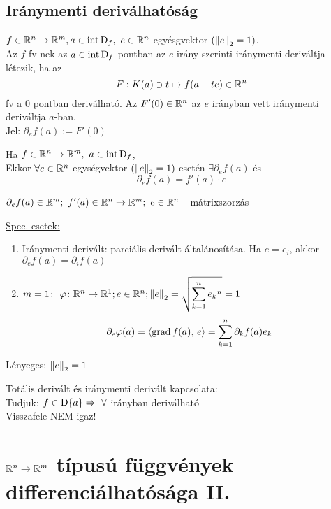 \subsection{Iránymenti deriválhatóság}

\begin{de}
  $f\in\mathbb{R}^n\to\mathbb{R}^m,\\a\in\operatorname{int\,D}_f,\ e\in\mathbb{R}^n $ egyésgvektor $(\left\Vert e\right\Vert_2 = 1)$.\\
  Az $f$ fv-nek az $a\in\operatorname{int\,D}_f$ pontban az $e$  irány szerinti iránymenti deriváltja létezik, ha az
  \[F: K(a)\owns t \mapsto f(a+te) \in \mathbb{R}^n\]
  fv a $0$ pontban deriválható. Az $F'(0)\in\mathbb{R}^n$ az $e$ irányban vett iránymenti deriváltja $a$-ban.\\
  Jel: $\partial_ef(a) := F'(0)$
\end{de}

\begin{te}
  Ha $f\in\mathbb{R}^n\to\mathbb{R}^m,\ a\in\operatorname{int\,D}_f$,\\
  Ekkor $\forall e\in\mathbb{R}^n$ egységvektor $(\left\Vert e\right\Vert_2 = 1)$ esetén $\exists\partial_ef(a)$ és
\[\partial_ef(a) = f'(a)\cdot e\]
\end{te}
\begin{megj} $\partial_ef(a)\in\R^m;\ f'(a) \in\RnRm;\ e\in\R^n$ - mátrixszorzás
\end{megj}
\underline{Spec. esetek:}
\begin{enumerate}
  \item Iránymenti derivált: parciális derivált általánosítása. Ha $e=e_i$, akkor $\partial_ef(a) = \partial_if(a)$
  \item $m=1\colon \ \varphi\colon\mathbb{R}^n\to\mathbb{R}^1; e\in\mathbb{R}^n; \left\Vert e\right\Vert_2=\displaystyle\sqrt{\sum_{k=1}^n{e_k}^n} = 1$
    \[\displaystyle \partial_e\varphi(a) = \langle\operatorname{grad} f(a),\,e\rangle = \sum_{k=1}^n \partial_kf(a)e_k\]
\end{enumerate}
\begin{Megj}
\item Lényeges: $\left\Vert e\right\Vert_2=1$
\item Totális derivált és iránymenti derivált kapcsolata:\\
  Tudjuk: $f\in\operatorname{D}\{a\}\Rightarrow\ \forall$ irányban deriválható\\
  Visszafele NEM igaz!
\end{Megj}


\newpage
\section{$\mathbb{R}^n\to\mathbb{R}^m$ típusú függvények differenciálhatósága II.}

